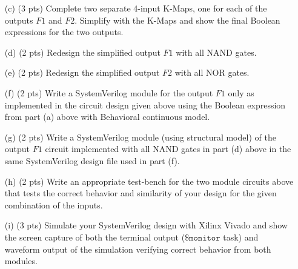 \documentclass{article}
\begin{document}
\begin{enumerate}
    \item[(c)] (3 pts) Complete two separate 4-input K-Maps, one for each of the outputs $F1$ and $F2$. Simplify with the K-Maps and show the final Boolean expressions for the two outputs.

    \item[(d)] (2 pts) Redesign the simplified output $F1$ with all NAND gates.

    \item[(e)] (2 pts) Redesign the simplified output $F2$ with all NOR gates.

    \item[(f)] (2 pts) Write a SystemVerilog module for the output $F1$ only as implemented in the circuit design given above using the Boolean expression from part (a) above with Behavioral continuous model.

    \item[(g)] (2 pts) Write a SystemVerilog module (using structural model) of the output $F1$ circuit implemented with all NAND gates in part (d) above in the same SystemVerilog design file used in part (f).

    \item[(h)] (2 pts) Write an appropriate test-bench for the two module circuits above that tests the correct behavior and similarity of your design for the given combination of the inputs.

    \item[(i)] (3 pts) Simulate your SystemVerilog design with Xilinx Vivado and show the screen capture of both the terminal output ($\texttt{\$monitor}$ task) and waveform output of the simulation verifying correct behavior from both modules.
\end{enumerate}
\end{document}

